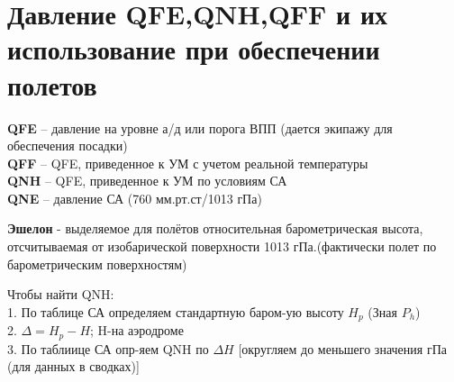 
\section{Давление QFE,QNH,QFF и их использование при обеспечении полетов}
\par \textbf{QFE} – давление на уровне а/д или порога ВПП
(дается экипажу для обеспечения посадки)\\
\textbf{QFF} – QFE, приведенное к УМ с учетом реальной температуры\\
\textbf{QNH} – QFE, приведенное к УМ по условиям СА\\
\textbf{QNE} – давление СА (760 мм.рт.ст/1013 гПа)

\textbf{Эшелон} - выделяемое для полётов относительная барометрическая высота, отсчитываемая от изобарической поверхности 1013 гПа.(фактически полет по барометрическим поверхностям)

Чтобы найти QNH:\\
1. По таблице СА определяем стандартную баром-ую высоту $H_p$ (Зная $P_h$)\\
2. $\varDelta=H_p-H$; H-на аэродроме\\
3. По таблиице СА опр-яем QNH по $\varDelta H$ [округляем до меньшего значения гПа (для данных в сводках)]